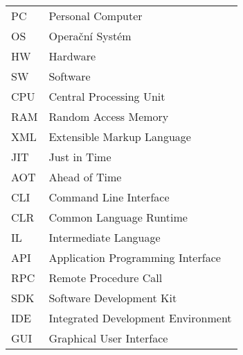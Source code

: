 
\seznamzkr

\begin{tabular}{ll}
PC & Personal Computer \\
OS & Operační Systém \\
HW & Hardware \\
SW & Software \\
CPU & Central Processing Unit \\
RAM & Random Access Memory \\
XML & Extensible Markup Language \\
JIT & Just in Time \\
AOT & Ahead of Time \\
CLI & Command Line Interface \\
CLR & Common Language Runtime \\
IL & Intermediate Language \\
API & Application Programming Interface \\
RPC & Remote Procedure Call \\
SDK & Software Development Kit \\
IDE & Integrated Development Environment \\
GUI & Graphical User Interface \\
\end{tabular}

